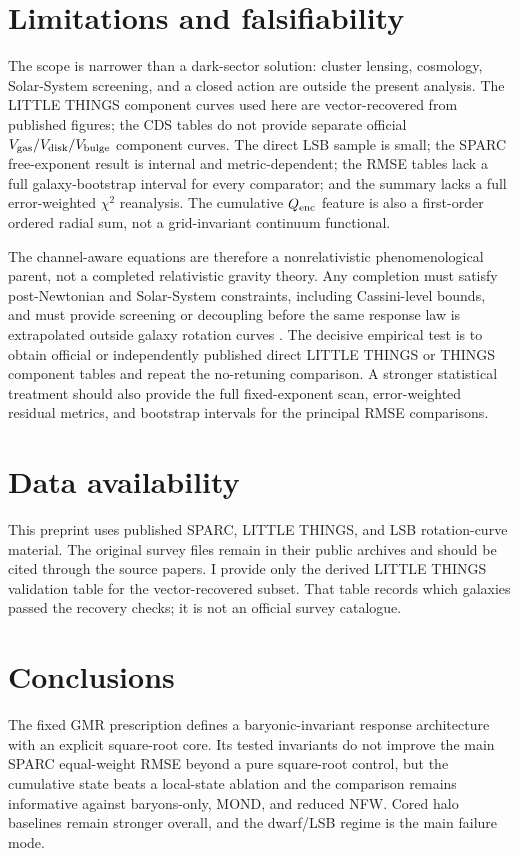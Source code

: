 ﻿\documentclass[twocolumn]{aastex631}
\begin{document}
\section{Limitations and falsifiability}
The scope is narrower than a dark-sector solution: cluster lensing, cosmology, Solar-System screening, and a closed action are outside the present analysis.  The LITTLE THINGS component curves used here are vector-recovered from published figures; the CDS tables do not provide separate official $V_{\rm gas}/V_{\rm disk}/V_{\rm bulge}$ component curves.  The direct LSB sample is small; the SPARC free-exponent result is internal and metric-dependent; the RMSE tables lack a full galaxy-bootstrap interval for every comparator; and the summary lacks a full error-weighted $\chi^2$ reanalysis.  The cumulative $Q_{\rm enc}$ feature is also a first-order ordered radial sum, not a grid-invariant continuum functional.

The channel-aware equations are therefore a nonrelativistic phenomenological parent, not a completed relativistic gravity theory.  Any completion must satisfy post-Newtonian and Solar-System constraints, including Cassini-level bounds, and must provide screening or decoupling before the same response law is extrapolated outside galaxy rotation curves \citep{Bertotti2003,Will2014LRR,KhouryWeltman2004}.  The decisive empirical test is to obtain official or independently published direct LITTLE THINGS or THINGS component tables and repeat the no-retuning comparison.  A stronger statistical treatment should also provide the full fixed-exponent scan, error-weighted residual metrics, and bootstrap intervals for the principal RMSE comparisons.

\section{Data availability}
This preprint uses published SPARC, LITTLE THINGS, and LSB rotation-curve material.  The original survey files remain in their public archives and should be cited through the source papers.  I provide only the derived LITTLE THINGS validation table for the vector-recovered subset.  That table records which galaxies passed the recovery checks; it is not an official survey catalogue.

\section{Conclusions}
The fixed GMR prescription defines a baryonic-invariant response architecture with an explicit square-root core.  Its tested invariants do not improve the main SPARC equal-weight RMSE beyond a pure square-root control, but the cumulative state beats a local-state ablation and the comparison remains informative against baryons-only, MOND, and reduced NFW.  Cored halo baselines remain stronger overall, and the dwarf/LSB regime is the main failure mode.
\end{document}
